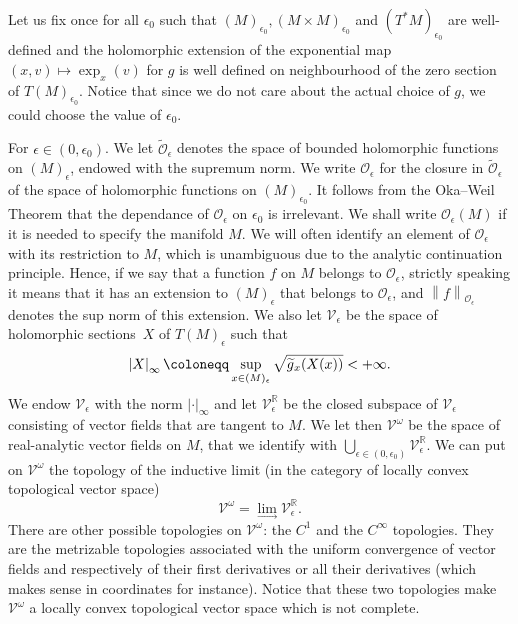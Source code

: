 \documentclass[10pt]{amsart}
\theoremstyle{definition}\newtheorem{defi}[theo]{Definition}\newtheorem{rema}[theo]{Remark}\newtheorem{exam}[theo]{Example}\newtheorem{exem}[theo]{Example}\newtheorem{nota}[theo]{Notation}
\newcommand{\n}[1]{\left\|#1\right\|}
\newcommand{\va}[1]{\left|#1\right|}
\newcommand{\clO}{\mathcal{O}}
\newcommand{\clV}{\mathcal{V}}
\newcommand{\bbR}{\mathbb{R}}
\let\oldtilde\tilde
\renewcommand*{\tilde}[1]{\mathchoice{\widetilde{#1}}{\widetilde{#1}}{\oldtilde{#1}}{\oldtilde{#1}}}
\begin{document}
Let us fix once for all $\epsilon_0$ such that $(M)_{\epsilon_0}, (M \times M)_{\epsilon_0}$ and $(T^* M)_{\epsilon_0}$ are well-defined and the holomorphic extension of the exponential map $(x,v) \mapsto \exp_x(v)$ for $g$ is well defined on neighbourhood of the zero section of $T(M)_{\epsilon_0}$. Notice that since we do not care about the actual choice of $g$, we could choose the value of $\epsilon_0$.

For $\epsilon \in (0,\epsilon_0)$. We let $\widetilde{\clO}_\epsilon$ denotes the space of bounded holomorphic functions on $(M)_\epsilon$, endowed with the supremum norm. We write $\clO_\epsilon$ for the closure in $\widetilde{\clO}_\epsilon$ of the space of holomorphic functions on $(M)_{\epsilon_0}$. It follows from the Oka--Weil Theorem that the dependance of $\clO_\epsilon$ on $\epsilon_0$ is irrelevant. We shall write $\clO_\epsilon(M)$ if it is needed to specify the manifold $M$. We will often identify an element of $\clO_\epsilon$ with its restriction to $M$, which is unambiguous due to the analytic continuation principle. Hence, if we say that a function $f$ on $M$ belongs to $\clO_\epsilon$, strictly speaking it means that it has an extension to $(M)_\epsilon$ that belongs to $\clO_\epsilon$, and $\n{f}_{\clO_\epsilon}$ denotes the sup norm of this extension. We also let $\clV_\epsilon$ be the space of holomorphic sections~$X$ of $T (M)_\epsilon$ such that
\begin{equation*}
\va{X}_\infty \coloneqq \sup_{x \in (M)_\epsilon} \sqrt{\tilde{g}_x(X(x))} < + \infty.
\end{equation*}
We endow $\clV_\epsilon$ with the norm $\va{\cdot}_\infty$ and let $\clV_\epsilon^{\bbR}$ be the closed subspace of $\clV_\epsilon$ consisting of vector fields that are tangent to $M$. We let then $\clV^\omega$ be the space of real-analytic vector fields on $M$, that we identify with $\bigcup_{\epsilon \in (0,\epsilon_0)} \clV_\epsilon^{\bbR}$. We can put on $\clV^\omega$ the topology of the inductive limit (in the category of locally convex topological vector space)
\begin{equation*}
\clV^\omega = \lim_{\to} \clV_\epsilon^{\bbR}.
\end{equation*}
There are other possible topologies on $\clV^\omega$: the $C^1$ and the $C^\infty$ topologies. They are the metrizable topologies associated with the uniform convergence of vector fields and respectively of their first derivatives or all their derivatives (which makes sense in coordinates for instance). Notice that these two topologies make $\clV^\omega$ a locally convex topological vector space which is not complete.
\end{document}
